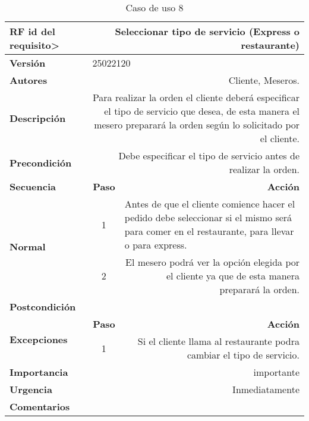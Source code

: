 \documentclass[conference]{IEEEtran}
\begin{document}
\begin{table}[H]
  \centering
   \begin{adjustbox}{width=0.45\textwidth}
    \begin{tabular}{|p{11.215em}|r|r|}
    \toprule
    \textbf{RF id del requisito>} & \multicolumn{2}{p{37.355em}|}{\textbf{Seleccionar tipo de servicio (Express o restaurante)}} \\
    \midrule
    \textbf{Versión} & \multicolumn{2}{l|}{25022120} \\
    \midrule
    \textbf{Autores} & \multicolumn{2}{p{37.355em}|}{Cliente, Meseros.} \\
    \midrule
    \textbf{Descripción} & \multicolumn{2}{p{37.355em}|}{Para realizar la orden el cliente deberá especificar el tipo de servicio que desea, de esta manera el mesero preparará la orden según lo solicitado por el cliente.} \\
    \midrule
    \textbf{Precondición} & \multicolumn{2}{p{37.355em}|}{Debe especificar el tipo de servicio antes de realizar la orden.} \\
    \midrule
    \textbf{Secuencia} & \multicolumn{1}{p{5.355em}|}{\textbf{Paso}} & \multicolumn{1}{p{32em}|}{\textbf{Acción}} \\
    \midrule
    \multirow{3}[4]{*}{\textbf{Normal}} & \multicolumn{1}{c|}{\multirow{2}[2]{*}{1}} & \multicolumn{1}{l|}{\multirow{2}[2]{*}{Antes de que el cliente comience hacer el pedido debe seleccionar si el mismo será para comer en el restaurante, para llevar o para express.}} \\
    \multicolumn{1}{|c|}{} & \multicolumn{1}{c|}{} &  \\
\cmidrule{2-3}    \multicolumn{1}{|c|}{} & \multicolumn{1}{c|}{2} & \multicolumn{1}{p{32em}|}{El mesero podrá ver la opción elegida por el cliente ya que de esta manera preparará la orden.} \\
    \midrule
    \textbf{Postcondición} & \multicolumn{2}{r|}{} \\
    \midrule
    \multirow{2}[4]{*}{\textbf{Excepciones}} & \multicolumn{1}{p{5.355em}|}{\textbf{Paso}} & \multicolumn{1}{p{32em}|}{\textbf{Acción}} \\
\cmidrule{2-3}    \multicolumn{1}{|c|}{} & \multicolumn{1}{c|}{1} & \multicolumn{1}{p{32em}|}{Si el cliente llama al restaurante podra cambiar el tipo de servicio.} \\
    \midrule
    \textbf{Importancia} & \multicolumn{2}{p{37.355em}|}{importante } \\
    \midrule
    \textbf{Urgencia} & \multicolumn{2}{p{37.355em}|}{Inmediatamente} \\
    \midrule
    \textbf{Comentarios} & \multicolumn{2}{r|}{} \\
    \bottomrule
    \end{tabular}%
    \end{adjustbox}
    \vspace{0.2cm}
    \caption{Caso de uso 8}
  \label{tab:addlabel}%
\end{table}%
\end{document}
